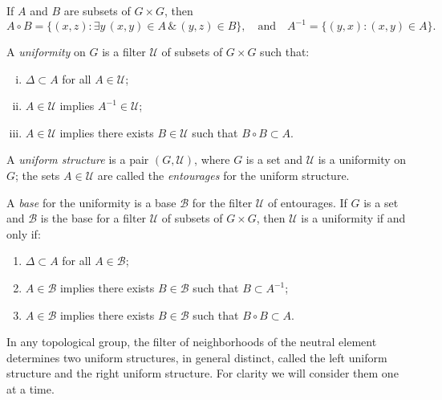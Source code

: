 \begin{definition}
    \label{def:uniformity-and-entourages}

    If \( A \) and \( B \) are subsets of \( G \times G \), then
    \[
        A \circ B = \{ (x, z) : \exists y\, (x, y) \in A \,\&\, (y, z) \in B \},
        \quad\text{and}\quad
        A^{-1} = \{ (y, x) : (x, y) \in A \}.
    \]

    A \emph{uniformity} on \( G \) is a filter \( \mathscr{U} \) of subsets of \( G \times G \) such that:
    \begin{enumerate}[(i)]
        \item \( \Delta \subset A \) for all \( A \in \mathscr{U} \);
        \item \( A \in \mathscr{U} \) implies \( A^{-1} \in \mathscr{U} \);
        \item \( A \in \mathscr{U} \) implies there exists \( B \in \mathscr{U} \) such that \( B \circ B \subset A \).
    \end{enumerate}

    A \emph{uniform structure} is a pair \( (G, \mathscr{U}) \), where \( G \) is a set and \( \mathscr{U} \) is a uniformity on \( G \);
    the sets \( A \in \mathscr{U} \) are called the \emph{entourages} for the uniform structure.

    A \emph{base} for the uniformity is a base \( \mathscr{B} \) for the filter \( \mathscr{U} \) of entourages.
    If \( G \) is a set and \( \mathscr{B} \) is the base for a filter \( \mathscr{U} \) of subsets of \( G \times G \), then
    \( \mathscr{U} \) is a uniformity if and only if:
    \begin{enumerate}[(i$'$)]
        \item \( \Delta \subset A \) for all \( A \in \mathscr{B} \);
        \item \( A \in \mathscr{B} \) implies there exists \( B \in \mathscr{B} \) such that \( B \subset A^{-1} \);
        \item \( A \in \mathscr{B} \) implies there exists \( B \in \mathscr{B} \) such that \( B \circ B \subset A \).
    \end{enumerate}

    In any topological group, the filter of neighborhoods of the neutral element determines two uniform structures, in general distinct, called the left uniform structure and the right uniform structure.
    For clarity we will consider them one at a time.
\end{definition}


